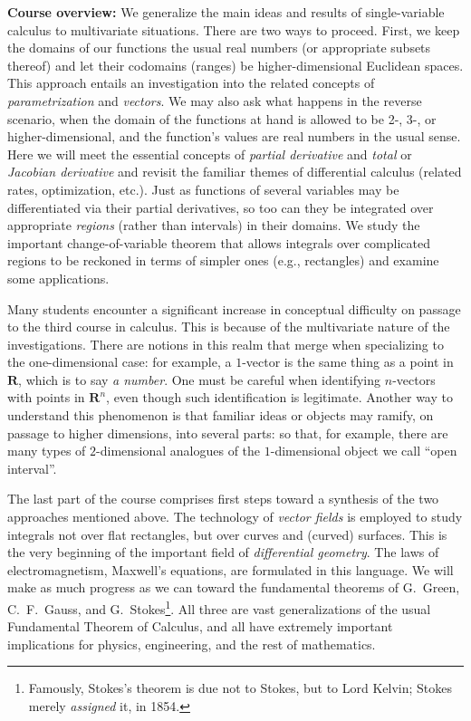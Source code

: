 \documentclass[12pt,twoside]{amsart}
\begin{document}
\textbf{Course overview:} We generalize the main ideas and results of single-variable calculus to multivariate situations. There are two ways to proceed. First, we keep the domains of our functions the usual real numbers (or appropriate subsets thereof) and let their codomains (ranges) be higher-dimensional Euclidean spaces. This approach entails an investigation into the related concepts of \emph{parametrization} and \emph{vectors}. We may also ask what happens in the reverse scenario, when the domain of the functions at hand is allowed to be 2-, 3-, or higher-dimensional, and the function's values are real numbers in the usual sense. Here we will meet the essential concepts of \emph{partial derivative} and \emph{total} or \emph{Jacobian derivative} and revisit the familiar themes of differential calculus (related rates, optimization, etc.). Just as functions of several variables may be differentiated via their partial derivatives, so too can they be integrated over appropriate \emph{regions} (rather than intervals) in their domains. We study the important change-of-variable theorem that allows integrals over complicated regions to be reckoned in terms of simpler ones (e.g., rectangles) and examine some applications.

Many students encounter a significant increase in conceptual difficulty on passage to the third course in calculus. This is because of the multivariate nature of the investigations. There are notions in this realm that merge when specializing to the one-dimensional case: for example, a $1$-vector is the same thing as a point in $\mathbf{R}$, which is to say \emph{a number}. One must be careful when identifying $n$-vectors with points in $\mathbf{R}^n$, even though such identification is  legitimate. Another way to understand this phenomenon is that familiar ideas or objects may ramify, on passage to higher dimensions, into several parts: so that, for example, there are many types of $2$-dimensional analogues of the $1$-dimensional object we call ``open interval''.

The last part of the course comprises first steps toward a synthesis of the two approaches mentioned above. The technology of \emph{vector fields} is employed to study integrals not over flat rectangles, but over curves and (curved) surfaces. This is the very beginning of the important field of \emph{differential geometry}. The laws of electromagnetism, Maxwell's equations, are formulated in this language. We will make as much progress as we can toward the fundamental theorems of G.\ Green, C.\ F.\ Gauss, and G.\ Stokes\footnote{Famously, Stokes's theorem is due not to Stokes, but to Lord Kelvin; Stokes merely \emph{assigned} it, in 1854.}. All three are vast generalizations of the usual Fundamental Theorem of Calculus, and all have extremely important implications for physics, engineering, and the rest of mathematics.
\end{document}
